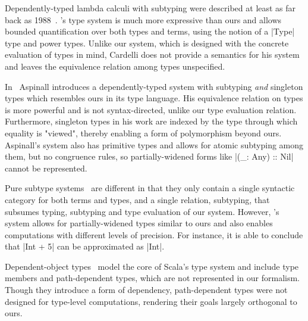 \begin{diff}
Dependently-typed lambda calculi with subtyping were described at least as far back as 1988~\citep{cardelli1988structural}.
\citeauthor{cardelli1988structural}'s type system is much more expressive than ours and allows bounded quantification over both types and terms, using the notion of a |Type| type and power types.
Unlike our system, which is designed with the concrete evaluation of types in mind, Cardelli does not provide a semantics for his system and leaves the equivalence relation among types unspecified.

In~\citep{aspinall1994subtyping} Aspinall introduces a dependently-typed system with subtyping \emph{and} singleton types which resembles ours in its type language.
His equivalence relation on types is more powerful and is not syntax-directed, unlike our type evaluation relation.
Furthermore, singleton types in his work are indexed by the type through which equality is "viewed", thereby enabling a form of polymorphism beyond ours.
Aspinall's system also has primitive types and allows for atomic subtyping among them, but no congruence rules, so partially-widened forms like |(_: Any) :: Nil| cannot be represented.

Pure subtype systems~\citep{hutchins2010pure} are different in that they only contain a single syntactic category for both terms and types, and a single relation, subtyping, that subsumes typing, subtyping and type evaluation of our system.
However, \citeauthor{hutchins2010pure}'s system allows for partially-widened types similar to ours and also enables computations with different levels of precision.
For instance, it is able to conclude that |Int + 5| can be approximated as |Int|.

Dependent-object types~\citep{amin2017type} model the core of Scala's type system and include type members and path-dependent types, which are not represented in our formalism.
Though they introduce a form of dependency, path-dependent types were not designed for type-level computations, rendering their goals largely orthogonal to ours.
\end{diff}
